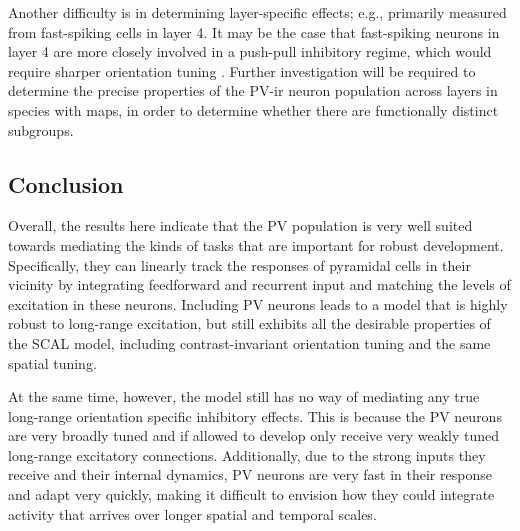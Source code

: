Another difficulty is in determining layer-specific effects; e.g.,
\cite{Cardin2007} primarily measured from fast-spiking cells in layer
4. It may be the case that fast-spiking neurons in layer 4 are more
closely involved in a push-pull inhibitory regime, which would require
sharper orientation tuning \citep{Hirsch2003, Hirsch2006a}. Further
investigation will be required to determine the precise properties of
the PV-ir neuron population across layers in species with maps, in
order to determine whether there are functionally distinct subgroups.

\subsection{Conclusion}

Overall, the results here indicate that the PV population is very well
suited towards mediating the kinds of tasks that are important for
robust development. Specifically, they can linearly track the
responses of pyramidal cells in their vicinity by integrating
feedforward and recurrent input and matching the levels of excitation
in these neurons. Including PV neurons leads to a model that is highly
robust to long-range excitation, but still exhibits all the desirable
properties of the SCAL model, including contrast-invariant orientation
tuning and the same spatial tuning.

At the same time, however, the model still has no way of mediating any
true long-range orientation specific inhibitory effects. This is
because the PV neurons are very broadly tuned and if allowed to
develop only receive very weakly tuned long-range excitatory
connections. Additionally, due to the strong inputs they receive and
their internal dynamics, PV neurons are very fast in their response
and adapt very quickly, making it difficult to envision how they could
integrate activity that arrives over longer spatial and temporal
scales.
